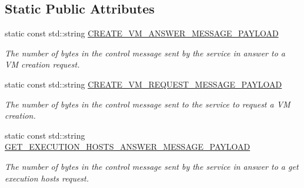\subsection*{Static Public Attributes}
\begin{DoxyCompactItemize}
\item 
\mbox{\label{classwrench_1_1_cloud_service_message_payload_a4baff1046f125b8028edfc8b39ac3479}} 
static const std\+::string \hyperlink{classwrench_1_1_cloud_service_message_payload_a4baff1046f125b8028edfc8b39ac3479}{C\+R\+E\+A\+T\+E\+\_\+\+V\+M\+\_\+\+A\+N\+S\+W\+E\+R\+\_\+\+M\+E\+S\+S\+A\+G\+E\+\_\+\+P\+A\+Y\+L\+O\+AD}
\begin{DoxyCompactList}\small\item\em The number of bytes in the control message sent by the service in answer to a VM creation request. \end{DoxyCompactList}\item 
\mbox{\label{classwrench_1_1_cloud_service_message_payload_a02e27dcb5db011cc95718df537866eab}} 
static const std\+::string \hyperlink{classwrench_1_1_cloud_service_message_payload_a02e27dcb5db011cc95718df537866eab}{C\+R\+E\+A\+T\+E\+\_\+\+V\+M\+\_\+\+R\+E\+Q\+U\+E\+S\+T\+\_\+\+M\+E\+S\+S\+A\+G\+E\+\_\+\+P\+A\+Y\+L\+O\+AD}
\begin{DoxyCompactList}\small\item\em The number of bytes in the control message sent to the service to request a VM creation. \end{DoxyCompactList}\item 
\mbox{\label{classwrench_1_1_cloud_service_message_payload_a1a8446c3a946db300e5c19a13959bdd0}} 
static const std\+::string \hyperlink{classwrench_1_1_cloud_service_message_payload_a1a8446c3a946db300e5c19a13959bdd0}{G\+E\+T\+\_\+\+E\+X\+E\+C\+U\+T\+I\+O\+N\+\_\+\+H\+O\+S\+T\+S\+\_\+\+A\+N\+S\+W\+E\+R\+\_\+\+M\+E\+S\+S\+A\+G\+E\+\_\+\+P\+A\+Y\+L\+O\+AD}
\begin{DoxyCompactList}\small\item\em The number of bytes in the control message sent by the service in answer to a get execution hosts request. \end{DoxyCompactList}\item 
\mbox{\label{classwrench_1_1_cloud_service_message_payload_a0c4ac7c65733155c7819d9c2b0528939}} 

\end{DoxyCompactItemize}
